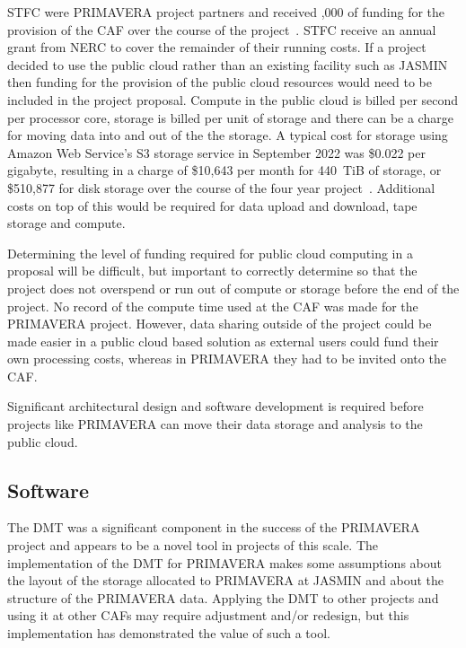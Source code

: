 \documentclass[gmd, manuscript]{copernicus}
\begin{document}
STFC were PRIMAVERA project partners and received ,000 of funding for the provision of the CAF over the course of the project~\citep{Bennett2020}. STFC receive an annual grant from NERC to cover the remainder of their running costs. If a project decided to use the public cloud rather than an existing facility such as JASMIN then funding for the provision of the public cloud resources would need to be included in the project proposal. Compute in the public cloud is billed per second per processor core, storage is billed per unit of storage and there can be a charge for moving data into and out of the the storage. A typical cost for storage using Amazon Web Service's S3 storage service in September 2022 was \$0.022 per gigabyte, resulting in a charge of \$10,643 per month for 440~TiB of storage, or \$510,877 for disk storage over the course of the four year project~\citep{aws_calculator}. Additional costs on top of this would be required for data upload and download, tape storage and compute.

Determining the level of funding required for public cloud computing in a proposal will be difficult, but important to correctly determine so that the project does not overspend or run out of compute or storage before the end of the project. No record of the compute time used at the CAF was made for the PRIMAVERA project. However, data sharing outside of the project could be made easier in a public cloud based solution as external users could fund their own processing costs, whereas in PRIMAVERA they had to be invited onto the CAF.

Significant architectural design and software development is required before projects like PRIMAVERA can move their data storage and analysis to the public cloud.

\subsection{Software}

The DMT was a significant component in the success of the PRIMAVERA project and appears to be a novel tool in projects of this scale. The implementation of the DMT for PRIMAVERA makes some assumptions about the layout of the storage allocated to PRIMAVERA at JASMIN and about the structure of the PRIMAVERA data. Applying the DMT to other projects and using it at other CAFs may require adjustment and/or redesign, but this implementation has demonstrated the value of such a tool.
\end{document}
